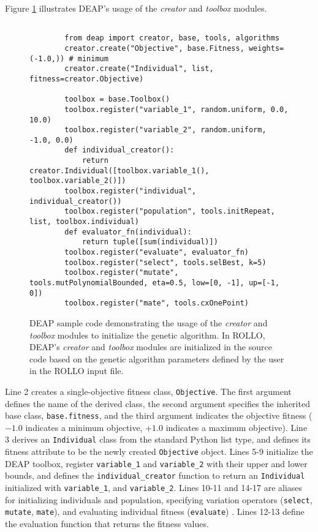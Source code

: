 Figure \ref{fig:deap-code} illustrates \gls{DEAP}'s usage of the \textit{creator} and
\textit{toolbox} modules. 
\begin{figure}[]
    \begin{verbatim}
        
        from deap import creator, base, tools, algorithms
        creator.create("Objective", base.Fitness, weights=(-1.0,)) # minimum
        creator.create("Individual", list, fitness=creator.Objective)

        toolbox = base.Toolbox()
        toolbox.register("variable_1", random.uniform, 0.0, 10.0)
        toolbox.register("variable_2", random.uniform, -1.0, 0.0)
        def individual_creator():
            return creator.Individual([toolbox.variable_1(), toolbox.variable_2()])
        toolbox.register("individual", individual_creator())
        toolbox.register("population", tools.initRepeat, list, toolbox.individual)
        def evaluator_fn(individual):
            return tuple([sum(individual)])
        toolbox.register("evaluate", evaluator_fn)
        toolbox.register("select", tools.selBest, k=5)
        toolbox.register("mutate", tools.mutPolynomialBounded, eta=0.5, low=[0, -1], up=[-1, 0])
        toolbox.register("mate", tools.cxOnePoint)
    \end{verbatim}
    \caption{DEAP sample code demonstrating the usage of the \textit{creator} and
    \textit{toolbox} modules to initialize the genetic algorithm. In \gls{ROLLO}, \gls{DEAP}'s 
    \textit{creator} and \textit{toolbox} modules are initialized in the source 
    code based on the genetic algorithm parameters defined by the user in the 
    \gls{ROLLO} input file. }
    \label{fig:deap-code}
\end{figure}
Line 2 creates a single-objective fitness class, \texttt{Objective}. 
The first argument defines the name of the derived class, the second argument 
specifies the inherited base class, \texttt{base.fitness}, and the third 
argument indicates the objective fitness ($-1.0$ indicates a minimum objective, 
$+1.0$ indicates a maximum objective). 
Line 3 derives an \texttt{Individual} class from the standard Python list type,
and defines its fitness attribute to be the newly created \texttt{Objective} object. 
Lines 5-9 initialize the \gls{DEAP} toolbox, register 
\texttt{variable\_1} and \texttt{variable\_2} with their upper and lower bounds, 
and defines the \texttt{individual\_creator} function to return an 
\texttt{Individual} initialized with \texttt{variable\_1}, and \texttt{variable\_2}. 
Lines 10-11 and 14-17 are aliases for initializing individuals and population, 
specifying variation operators (\texttt{select}, \texttt{mutate}, \texttt{mate}), 
and evaluating individual fitness (\texttt{evaluate}) \cite{fortin_deap_2012}. 
Lines 12-13 define the evaluation function that returns the fitness values. 

